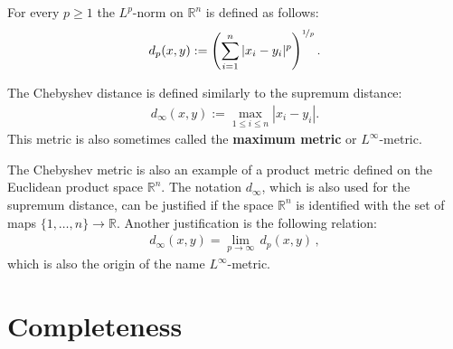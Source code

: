     \begin{example}[p-metric]\label{metric:p_metric}
        For every $p\geq1$ the $L^p$-norm on $\mathbb{R}^n$ is defined as follows:
        \begin{gather}
            d_p(x,y) := \left(\sum_{i=1}^n|x_i-y_i|^p\right)^{\nicefrac{1}{p}}.
        \end{gather}
    \end{example}
    \begin{example}\label{metric:chebyshev_distance}
        The Chebyshev distance is defined similarly to the supremum distance:
        \begin{gather}
            d_\infty(x,y) := \max_{1\leq i\leq n}|x_i-y_i|.
        \end{gather}
        This metric is also sometimes called the \textbf{maximum metric} or $L^\infty$-metric.
    \end{example}
    \begin{remark}
        The Chebyshev metric is also an example of a product metric defined on the Euclidean product space $\mathbb{R}^n$. The notation $d_\infty$, which is also used for the supremum distance, can be justified if the space $\mathbb{R}^n$ is identified with the set of maps $\{1,\ldots,n\}\rightarrow\mathbb{R}$. Another justification is the following relation:
        \begin{gather}
            d_\infty(x,y) = \lim_{p\rightarrow\infty}\,d_p(x,y)\,,
        \end{gather}
        which is also the origin of the name $L^\infty$-metric.
    \end{remark}

\section{Completeness}


